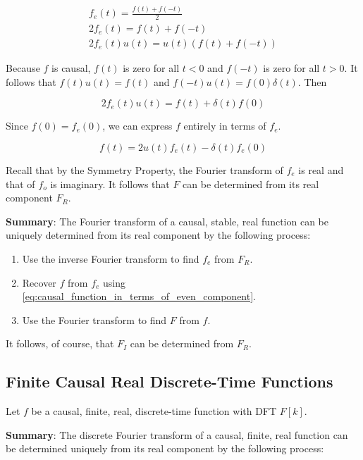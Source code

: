 \begin{gather*}
	f_e(t) = \frac{f(t) + f(-t)}{2} \\
	2f_e(t) = f(t) + f(-t) \\
	2f_e(t)u(t) = u(t)(f(t) + f(-t))
\end{gather*}

Because $f$ is causal, $f(t)$ is zero for all $t < 0$ and $f(-t)$ is zero for all $t > 0$. It follows that $f(t)u(t) = f(t)$ and $f(-t)u(t) = f(0)\delta(t)$. Then

\begin{equation*}
	2f_e(t)u(t) = f(t) + \delta(t)f(0)
\end{equation*}

Since $f(0) = f_e(0)$, we can express $f$ entirely in terms of $f_e$.

\begin{equation} \label{eq:causal_function_in_terms_of_even_component}
	f(t) = 2u(t)f_e(t) - \delta(t)f_e(0)
\end{equation}

Recall that by the Symmetry Property, the Fourier transform of $f_e$ is real and that of $f_o$ is imaginary. It follows that $F$ can be determined from its real component $F_R$.

\textbf{Summary}: The Fourier transform of a causal, stable, real function can be uniquely determined from its real component by the following process:

\begin{enumerate}
	\item Use the inverse Fourier transform to find $f_e$ from $F_R$.
	\item Recover $f$ from $f_e$ using \eqref{eq:causal_function_in_terms_of_even_component}.
	\item Use the Fourier transform to find $F$ from $f$.
\end{enumerate}

It follows, of course, that $F_I$ can be determined from $F_R$.



\subsection{Finite Causal Real Discrete-Time Functions}
Let $f$ be a causal, finite, real, discrete-time function with DFT $F[k]$. 

\textbf{Summary}: The discrete Fourier transform of a causal, finite, real function can be determined uniquely from its real component by the following process:

